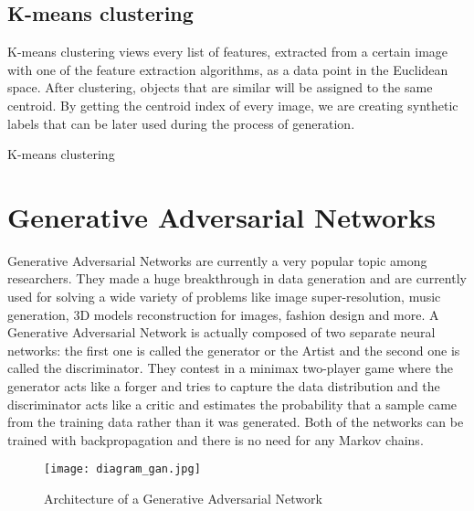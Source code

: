 \documentclass{article}
\begin{document}
\subsection{K-means clustering}

K-means clustering views every list of features, extracted from a certain image with one of the feature extraction algorithms, as a data point in the Euclidean space. After clustering, objects that are similar will be assigned to the same centroid. By getting the centroid index of every image, we are creating synthetic labels that can be later used during the process of generation.

\begin{algorithm}
\caption{K-means clustering}
\begin{algorithmic}[1]
\EndWhile
\end{algorithmic}
\end{algorithm}

\newpage

\section{Generative Adversarial Networks}
Generative Adversarial Networks are currently a very popular topic among researchers. They made a huge breakthrough in data generation and are currently used for solving a wide variety of problems like image super-resolution, music generation, 3D models reconstruction for images, fashion design and more. A Generative Adversarial Network is actually composed of two separate neural networks: the first one is called the generator or the Artist and the second one is called the discriminator. They contest in a minimax two-player game where the generator acts like a forger and tries to capture the data distribution and the discriminator acts like a critic and estimates the probability that a sample came from the training data rather than it was generated. Both of the networks can be trained with backpropagation and there is no need for any Markov chains.

\begin{figure}[ht]
    \centering
    \texttt{[image: diagram\_gan.jpg]}
    \caption{Architecture of a Generative Adversarial Network}
    \label{fig:gan}
\end{figure}
\end{document}
